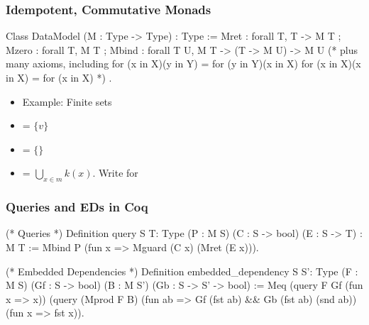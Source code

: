 \documentclass{beamer}
\begin{document}
\begin{frame}[fragile]
\frametitle{Idempotent, Commutative Monads}
\begin{coq}
Class DataModel (M : Type -> Type) : Type :=
{ Mret  : forall {T}, T -> M T
; Mzero : forall {T}, M T
; Mbind : forall {T U}, M T -> (T -> M U) -> M U
 (* plus many axioms, including
     for (x in X)(y in Y) = for (y in Y)(x in X)
     for (x in X)(x in X) = for (x in X)
  *)
}.
\end{coq}
\begin{itemize}
\item Example: Finite sets
\item {} = $\{ v \}$
\item {} = $\{ \}$
\item {} = $\bigcup_{x \in m} k(x)$.  Write  for 
\end{itemize}
\end{frame}

\begin{frame}[fragile]
\frametitle{Queries and EDs in Coq}
\begin{coq}
(* Queries *)
Definition query {S T: Type}
  (P : M S) (C : S -> bool) (E : S -> T) : M T :=
  Mbind P (fun x => Mguard (C x) (Mret (E x))).

(* Embedded Dependencies *)
Definition embedded_dependency {S S': Type}
  (F : M S) (Gf : S -> bool) (B : M S') (Gb : S -> S' -> bool)
:= Meq (query F Gf (fun x => x))
       (query (Mprod F B)
              (fun ab => Gf (fst ab) && Gb (fst ab) (snd ab))
              (fun x => fst x)).
\end{coq}
%              
\end{frame}
\end{document}

